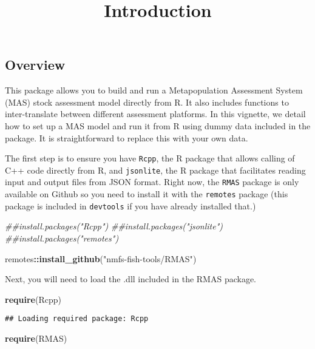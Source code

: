 \documentclass[
]{article}
\title{Introduction}
\author{}
\date{\vspace{-2.5em}}
\newenvironment{Shaded}{\begin{snugshade}}{\end{snugshade}}
\newcommand{\CommentTok}[1]{\textcolor[rgb]{0.56,0.35,0.01}{\textit{#1}}}
\newcommand{\KeywordTok}[1]{\textcolor[rgb]{0.13,0.29,0.53}{\textbf{#1}}}
\newcommand{\NormalTok}[1]{#1}
\newcommand{\OperatorTok}[1]{\textcolor[rgb]{0.81,0.36,0.00}{\textbf{#1}}}
\newcommand{\StringTok}[1]{\textcolor[rgb]{0.31,0.60,0.02}{#1}}
\begin{document}
\maketitle

\hypertarget{overview}{%
\subsection{Overview}\label{overview}}

This package allows you to build and run a Metapopulation Assessment
System (MAS) stock assessment model directly from R. It also includes
functions to inter-translate between different assessment platforms. In
this vignette, we detail how to set up a MAS model and run it from R
using dummy data included in the package. It is straightforward to
replace this with your own data.

The first step is to ensure you have \texttt{Rcpp}, the R package that
allows calling of C++ code directly from R, and \texttt{jsonlite}, the R
package that facilitates reading input and output files from JSON
format. Right now, the \texttt{RMAS} package is only available on Github
so you need to install it with the \texttt{remotes} package (this
package is included in \texttt{devtools} if you have already installed
that.)

\begin{Shaded}
\begin{Highlighting}[]
\CommentTok{##install.packages("Rcpp")}
\CommentTok{##install.packages("jsonlite")}
\CommentTok{##install.packages("remotes")}

\NormalTok{remotes}\OperatorTok{::}\KeywordTok{install_github}\NormalTok{(}\StringTok{"nmfs-fish-tools/RMAS"}\NormalTok{)}
\end{Highlighting}
\end{Shaded}

Next, you will need to load the .dll included in the RMAS package.

\begin{Shaded}
\begin{Highlighting}[]
\KeywordTok{require}\NormalTok{(Rcpp)}
\end{Highlighting}
\end{Shaded}

\begin{verbatim}
## Loading required package: Rcpp
\end{verbatim}

\begin{Shaded}
\begin{Highlighting}[]
\KeywordTok{require}\NormalTok{(RMAS)}
\end{Highlighting}
\end{Shaded}
\end{document}
